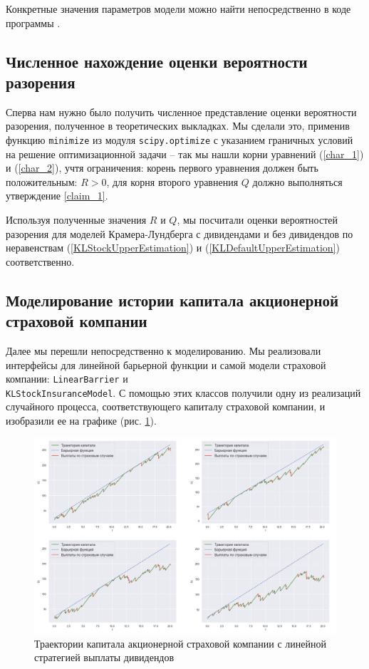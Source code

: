 \documentclass{article}
\theoremstyle{plain}
\theoremstyle{plain}
\theoremstyle{plain}
\theoremstyle{plain}
\theoremstyle{definition}
\theoremstyle{remark}
\begin{document}
Конкретные значения параметров модели можно найти непосредственно в коде программы \cite{model-juyter-notebook}.

\subsection{Численное нахождение оценки вероятности разорения}

Сперва нам нужно было получить численное представление оценки вероятности разорения, полученное в теоретических выкладках. Мы сделали это, применив функцию \texttt{minimize} из модуля \texttt{scipy.optimize} с указанием граничных условий на решение оптимизационной задачи -- так мы нашли корни уравнений (\ref{char_1}) и (\ref{char_2}), учтя ограничения: корень первого уравнения должен быть положительным: $R > 0$, для корня второго уравнения $Q$ должно выполняться утверждение \ref{claim_1}.

Используя полученные значения $R$ и $Q$, мы посчитали оценки вероятностей разорения для моделей Крамера-Лундберга с дивидендами и без дивидендов по неравенствам (\ref{KLStockUpperEstimation}) и (\ref{KLDefaultUpperEstimation}) соответственно.

\subsection{Моделирование истории капитала акционерной страховой компании}

Далее мы перешли непосредственно к моделированию. Мы реализовали интерфейсы для линейной барьерной функции и самой модели страховой компании: \texttt{LinearBarrier} и \\
\texttt{KLStockInsuranceModel}. С помощью этих классов получили одну из реализаций случайного процесса, соответствующего капиталу страховой компании, и изобразили ее на графике (рис. \ref{stock_trajectory}).

\begin{figure}[h]
\centering
\includegraphics[scale=0.5]{images/KL_stock_trajectory.png}
\captionsetup{justification=centering}
\caption{Траектории капитала акционерной страховой компании с линейной стратегией выплаты дивидендов}
\label{stock_trajectory}
\end{figure}
\end{document}
